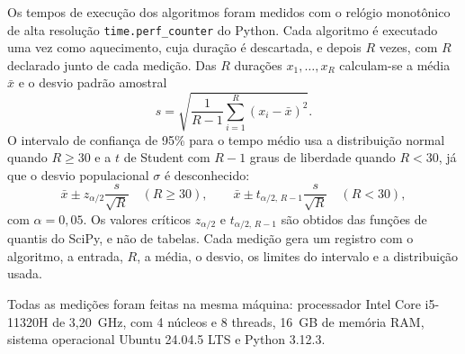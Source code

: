 Os tempos de execução dos algoritmos foram medidos com o relógio monotônico de alta resolução \texttt{time.perf\_counter} do Python. Cada algoritmo é executado uma vez como aquecimento, cuja duração é descartada, e depois $R$ vezes, com $R$ declarado junto de cada medição. Das $R$ durações $x_1, \dots, x_R$ calculam-se a média $\bar{x}$ e o desvio padrão amostral
\[
  s = \sqrt{\frac{1}{R - 1} \sum_{i=1}^{R} (x_i - \bar{x})^2}.
\]
O intervalo de confiança de 95\% para o tempo médio usa a distribuição normal quando $R \geq 30$ e a $t$ de Student com $R - 1$ graus de liberdade quando $R < 30$, já que o desvio populacional $\sigma$ é desconhecido:
\[
  \bar{x} \pm z_{\alpha/2} \frac{s}{\sqrt{R}} \quad (R \geq 30),
  \qquad
  \bar{x} \pm t_{\alpha/2,\,R-1} \frac{s}{\sqrt{R}} \quad (R < 30),
\]
com $\alpha = 0{,}05$. Os valores críticos $z_{\alpha/2}$ e $t_{\alpha/2,\,R-1}$ são obtidos das funções de quantis do SciPy, e não de tabelas. Cada medição gera um registro com o algoritmo, a entrada, $R$, a média, o desvio, os limites do intervalo e a distribuição usada.

Todas as medições foram feitas na mesma máquina: processador Intel Core i5-11320H de 3,20~GHz, com 4 núcleos e 8 threads, 16~GB de memória RAM, sistema operacional Ubuntu 24.04.5 LTS e Python 3.12.3.
